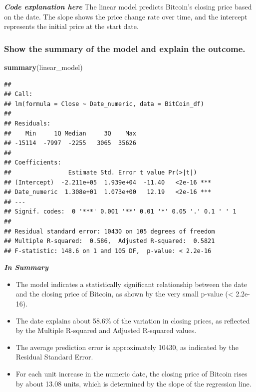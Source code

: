 \documentclass[
]{book}
\newenvironment{Shaded}{\begin{snugshade}}{\end{snugshade}}
\newcommand{\FunctionTok}[1]{\textcolor[rgb]{0.13,0.29,0.53}{\textbf{#1}}}
\newcommand{\NormalTok}[1]{#1}
\providecommand{\tightlist}{%
  \setlength{\itemsep}{0pt}\setlength{\parskip}{0pt}}
\begin{document}
\emph{\textbf{Code explanation here}}
The linear model predicts Bitcoin's closing price based on the date. The slope shows the price change rate over time, and the intercept represents the initial price at the start date.

\subsubsection{Show the summary of the model and explain the outcome.}\label{show-the-summary-of-the-model-and-explain-the-outcome.}

\begin{Shaded}
\begin{Highlighting}[]
\FunctionTok{summary}\NormalTok{(linear\_model)}
\end{Highlighting}
\end{Shaded}

\begin{verbatim}
## 
## Call:
## lm(formula = Close ~ Date_numeric, data = BitCoin_df)
## 
## Residuals:
##    Min     1Q Median     3Q    Max 
## -15114  -7997  -2255   3065  35626 
## 
## Coefficients:
##                Estimate Std. Error t value Pr(>|t|)    
## (Intercept)  -2.211e+05  1.939e+04  -11.40   <2e-16 ***
## Date_numeric  1.308e+01  1.073e+00   12.19   <2e-16 ***
## ---
## Signif. codes:  0 '***' 0.001 '**' 0.01 '*' 0.05 '.' 0.1 ' ' 1
## 
## Residual standard error: 10430 on 105 degrees of freedom
## Multiple R-squared:  0.586,  Adjusted R-squared:  0.5821 
## F-statistic: 148.6 on 1 and 105 DF,  p-value: < 2.2e-16
\end{verbatim}

\emph{\textbf{In Summary}}

\begin{itemize}
\tightlist
\item
  The model indicates a statistically significant relationship between the date and the closing price of Bitcoin, as shown by the very small p-value (\textless{} 2.2e-16).
\item
  The date explains about 58.6\% of the variation in closing prices, as reflected by the Multiple R-squared and Adjusted R-squared values.
\item
  The average prediction error is approximately 10430, as indicated by the Residual Standard Error.
\item
  For each unit increase in the numeric date, the closing price of Bitcoin rises by about 13.08 units, which is determined by the slope of the regression line.
\end{itemize}
\end{document}

